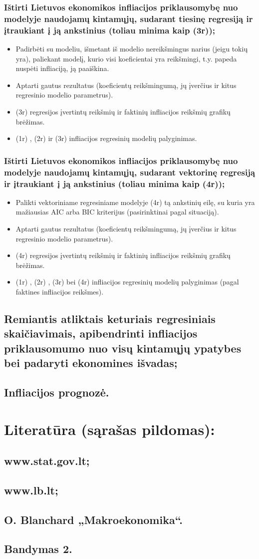 \documentclass[a4paper]{article}
\begin{document}
\subsubsection{Ištirti Lietuvos ekonomikos infliacijos priklausomybę nuo modelyje naudojamų kintamųjų, sudarant tiesinę regresiją ir  įtraukiant į ją ankstinius (toliau minima kaip (3r));}
\begin{itemize}
\item Padirbėti su modeliu, išmetant iš modelio nereikšmingus narius (jeigu tokių yra), paliekant modelį, kurio visi koeficientai yra reikšmingi, t.y. papeda nuspėti infliaciją, ją paaiškina.
\item Aptarti gautus rezultatus (koeficientų reikšmingumą, jų įverčius ir kitus regresinio modelio parametrus).
\item (3r) regresijos įvertintų reikšmių ir faktinių infliacijos reikšmių grafikų brėžimas.
\item (1r) , (2r) ir (3r) infliacijos regresinių modelių palyginimas.
\end{itemize}
\subsubsection{Ištirti Lietuvos ekonomikos infliacijos priklausomybę nuo modelyje naudojamų kintamųjų, sudarant vektorinę regresiją ir įtraukiant į ją ankstinius (toliau minima kaip (4r));}
\begin{itemize}
\item Palikti vektoriniame regresiniame  modelyje (4r)  tą ankstinių eilę, su kuria yra mažiausias AIC arba BIC kriterijus (pasirinktinai pagal situaciją).
\item Aptarti gautus rezultatus (koeficientų reikšmingumą, jų įverčius ir kitus regresinio modelio parametrus).
\item (4r) regresijos įvertintų reikšmių ir faktinių infliacijos reikšmių grafikų brėžimas.
\item (1r) , (2r) , (3r) bei (4r) infliacijos regresinių modelių palyginimas (pagal faktines infliacijos reikšmes).
\end{itemize}
\subsection{Remiantis atliktais keturiais regresiniais skaičiavimais, apibendrinti infliacijos priklausomumo  nuo visų kintamųjų ypatybes bei padaryti ekonomines išvadas;}
\subsection{	Infliacijos prognozė.}
\section{Literatūra (sąrašas pildomas):}
\subsection {www.stat.gov.lt;} 
\subsection{www.lb.lt;}
\subsection{O. Blanchard  „Makroekonomika“.}
\subsection{Bandymas  2.}
\end{document}
